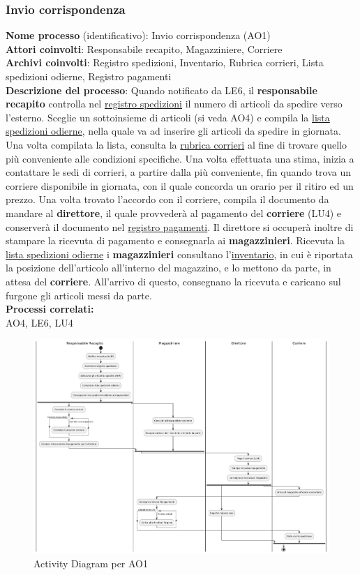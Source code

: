 \newpage
\subsubsection{Invio corrispondenza}
\textbf{Nome processo} (identificativo): Invio corrispondenza (AO1) \\
\textbf{Attori coinvolti}: Responsabile recapito, Magazziniere, Corriere \\
\textbf{Archivi coinvolti}: Registro spedizioni, Inventario, Rubrica corrieri, Lista spedizioni odierne, Registro pagamenti \\
\textbf{Descrizione del processo}: Quando notificato da LE6, il \textbf{responsabile recapito} controlla nel \underline{registro spedizioni} il numero di articoli
da spedire verso l'esterno. Sceglie un sottoinsieme di articoli (si veda AO4) e compila la \underline{lista spedizioni odierne}, 
nella quale va ad inserire gli articoli da spedire in giornata. Una volta compilata la lista, consulta la \underline{rubrica corrieri} al fine
di trovare quello più conveniente alle condizioni specifiche. Una volta effettuata una stima, inizia a contattare le sedi di corrieri, a partire dalla più 
conveniente, fin quando trova un corriere disponibile in giornata, con il quale concorda un orario per il ritiro ed un prezzo.
Una volta trovato l'accordo con il corriere, compila il documento da mandare al \textbf{direttore}, il quale provvederà al pagamento del \textbf{corriere} (LU4)
e conserverà il documento nel \underline{registro pagamenti}. Il direttore si occuperà inoltre di stampare la ricevuta di pagamento e 
consegnarla ai \textbf{magazzinieri}.
Ricevuta la \underline{lista spedizioni odierne} i \textbf{magazzinieri} consultano l'\underline{inventario}, in cui è riportata la posizione dell'articolo
all'interno del magazzino, e lo mettono da parte, in attesa del \textbf{corriere}. All'arrivo di questo, consegnano la ricevuta e caricano sul furgone gli articoli messi da parte. \\
\textbf{Processi correlati:}\\AO4, LE6, LU4\\
\begin{figure}[H]
  \centering
  \includegraphics[width=0.8\linewidth]{assets/activitydiagram_AO1.png}
  \caption{Activity Diagram per AO1}
\end{figure}

